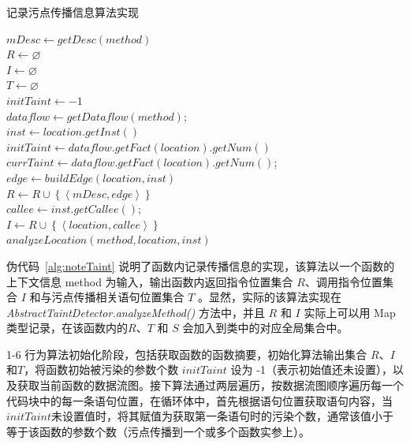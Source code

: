 \begin{algorithm}[!htb]\footnotesize
\caption{记录污点传播信息算法实现}
\label{alg:noteTaint}
$mDesc \leftarrow getDesc(method)$\\
$R \leftarrow \varnothing $\\
$I \leftarrow \varnothing $\\
$T \leftarrow \varnothing $\\
$initTaint \leftarrow -1$\\
$dataflow \leftarrow getDataflow(method)$;\\
 {
     {
        $inst \leftarrow location.getInst()$\\
         {
            $initTaint \leftarrow dataflow.getFact(location).getNum()$\\
        }
         {
            $currTaint \leftarrow dataflow.getFact(location).getNum()$;\\
             {
                $edge \leftarrow buildEdge(location, inst)$\\
                $R \leftarrow R \cup \left\{ \left\langle mDesc, edge \right\rangle \right\}$\\
            }
        }
         {
            $callee \leftarrow inst.getCallee()$;\\
            $I \leftarrow R \cup \left\{ \left\langle location, callee \right\rangle \right\}$\\
            $analyzeLocation(method, location, inst)$\\
        }
    }
}
\end{algorithm}

伪代码~\ref{alg:noteTaint} 说明了函数内记录传播信息的实现，该算法以一个函数的上下文信息 method 为输入，输出函数内返回指令位置集合 $R$、调用指令位置集合 $I$ 和与污点传播相关语句位置集合 $T$ 。显然，实际的该算法实现在 \textit{AbstractTaintDetector.analyzeMethod()} 方法中，并且 $R$ 和 $I$ 实际上可以用 Map 类型记录，在该函数内的$R$、$T$ 和 $S$ 会加入到类中的对应全局集合中。

1-6 行为算法初始化阶段，包括获取函数的函数摘要，初始化算法输出集合 $R$、$I$和$T$，将函数初始被污染的参数个数 $initTaint$ 设为 -1（表示初始值还未设置），以及获取当前函数的数据流图。接下算法通过两层遍历，按数据流图顺序遍历每一个代码块中的每一条语句位置，在循环体中，首先根据语句位置获取语句内容，当$initTaint$未设置值时，将其赋值为获取第一条语句时的污染个数，通常该值小于等于该函数的参数个数（污点传播到一个或多个函数实参上）。

